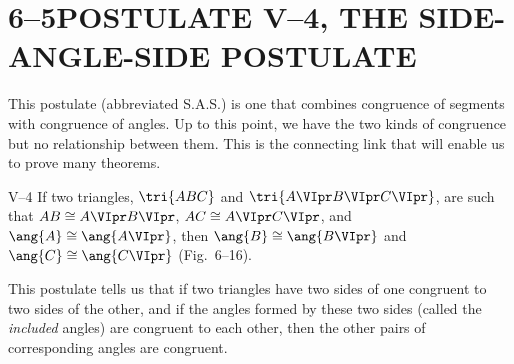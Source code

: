 \documentclass[11pt]{book}
\theoremstyle{bkplain}
\theoremstyle{XIplainnote}
\theoremstyle{bkplain}
\theoremstyle{bkplain}
\begin{document}
\section*{6--5\quad POSTULATE V--4, THE SIDE-ANGLE-SIDE POSTULATE}

This postulate (abbreviated S.A.S.) is one that combines congruence of segments
with congruence of angles. Up to this point, we have the two kinds of
congruence but no relationship between them. This is the connecting link that
will enable us to prove many theorems.

\medskip
\noindent
V--4 If two triangles, $\tri{ABC}$ and $\tri{A\VIpr B\VIpr C\VIpr}$, are such
that $AB \cong A\VIpr B\VIpr$, $AC \cong A\VIpr C\VIpr$, and $\ang{A} \cong
\ang{A\VIpr}$, then $\ang{B} \cong \ang{B\VIpr}$ and $\ang{C} \cong
\ang{C\VIpr}$ (Fig.~6--16).
\medskip

\FIGVISIXTEEN

This postulate tells us that if two triangles have two sides of one congruent
to two sides of the other, and if the angles formed by these two sides (called
the \emph{included} angles) are congruent to each other, then the other pairs
of corresponding angles are congruent.
\end{document}
